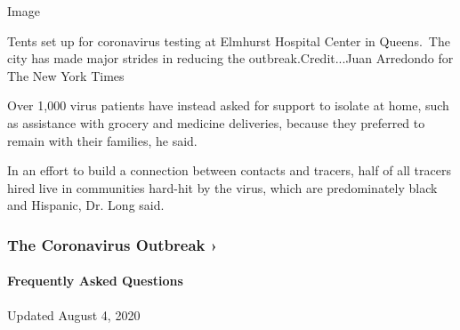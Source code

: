 Image

Tents set up for coronavirus testing at Elmhurst Hospital Center in
Queens.~The city has made major strides in reducing the
outbreak.Credit...Juan Arredondo for The New York Times

Over 1,000 virus patients have instead asked for support to isolate at
home, such as assistance with grocery and medicine deliveries, because
they preferred to remain with their families, he said.

In an effort to build a connection between contacts and tracers, half of
all tracers hired live in communities hard-hit by the virus, which are
predominately black and Hispanic, Dr. Long said.

\href{https://www.nytimes3xbfgragh.onion/news-event/coronavirus?action=click\&pgtype=Article\&state=default\&region=MAIN_CONTENT_3\&context=storylines_faq}{}

\hypertarget{the-coronavirus-outbreak-}{%
\subsubsection{The Coronavirus Outbreak
›}\label{the-coronavirus-outbreak-}}

\hypertarget{frequently-asked-questions}{%
\paragraph{Frequently Asked
Questions}\label{frequently-asked-questions}}

Updated August 4, 2020

